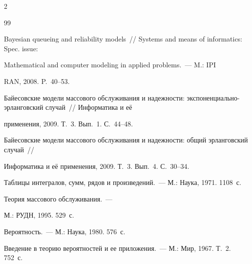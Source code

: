 \begin{multicols}{2}
{{\begin{thebibliography}{99}


Bayesian queueing and reliability models~// Systems and means of informatics: Spec. issue: 


Mathematical and computer modeling in applied problems.~--- M.: IPI


RAN, 2008. P.~40--53.









Байесовские модели массового обслуживания и надежности: экспоненциально-эрланговский случай~// Информатика и её 


применения, 2009. Т.~3. Вып.~1. С.~44--48.









Байесовские модели массового обслуживания и надежности: общий эрланговский случай~// 


Информатика и её применения, 2009. Т.~3. Вып.~4. С.~30--34.









Таблицы интегралов, сумм, рядов и произведений.~--- М.: Наука, 1971. 1108~с.









Теория массового обслуживания.~---


М.: РУДН, 1995. 529~с.









Вероятность.~--- М.: Наука, 1980. 576~с.





\label{end\stat}












Введение в теорию вероятностей и ее приложения.~--- М.: Мир, 1967. Т.~2. 752~с.


 \end{thebibliography}


}


}





\end{multicols}


